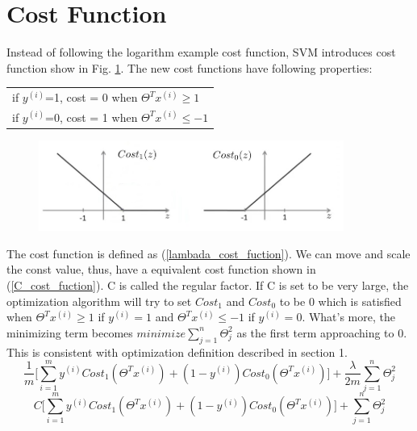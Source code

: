 \documentclass{article}
\begin{document}
\section{Cost Function}
Instead of following the logarithm example cost function, SVM introduces cost function show in Fig. \ref{example_cost_funtion_visulization}. The new cost functions have following properties:
\begin{table}[h]
\begin{center}
\begin{tabular}{l}
if $y^{(i)}$=1, cost = 0 when $\Theta^{T}x^{(i)} \ge 1$\\
if $y^{(i)}$=0, cost = 1 when $\Theta^{T}x^{(i)} \le -1$\\
\end{tabular}
\end{center}
\end{table}
\begin{figure}[ht]
  \centering
  \includegraphics[width=10cm]{Figure3.jpg}\\
  \caption{}\label{example_cost_funtion_visulization}
\end{figure}
The cost function is defined as (\ref{lambada_cost_fuction}). We can move and scale the const value, thus, have a equivalent cost function shown in (\ref{C_cost_fuction}). C is called the regular factor. If C is set to be very large, the optimization algorithm will try to set $Cost_{1}$ and $Cost_{0}$ to be 0 which is satisfied when $\Theta^{T}x^{(i)} \ge 1$ if $y^{(i)} = 1$ and $\Theta^{T}x^{(i)} \le -1$ if $y^{(i)} = 0$. What's more, the minimizing term becomes $minimize \sum_{j=1}^{n}\Theta_{j}^{2}$ as the first term approaching to 0. This is consistent with optimization definition described in section 1.
\begin{equation}\label{lambada_cost_fuction}
\frac{1}{m} \biggl[\sum_{i=1}^{m} y^{(i)}Cost_{1}(\Theta^{T}x^{(i)}) + (1 - y^{(i)})Cost_{0}(\Theta^{T}x^{(i)})\biggr] + \frac{\lambda}{2m}\sum_{j=1}^{n}\Theta_{j}^{2}
\end{equation}
\begin{equation}\label{C_cost_fuction}
C\biggl[\sum_{i=1}^{m} y^{(i)}Cost_{1}(\Theta^{T}x^{(i)}) + (1 - y^{(i)})Cost_{0}(\Theta^{T}x^{(i)})\biggr] + \sum_{j=1}^{n}\Theta_{j}^{2}
\end{equation}
\end{document}
